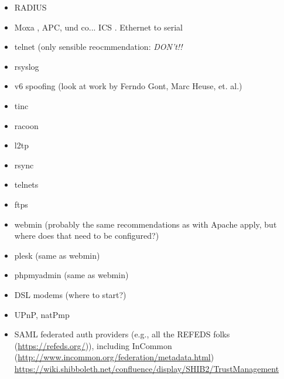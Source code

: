 \begin{minipage}[b]{0.5\linewidth}
\begin{itemize}
\item RADIUS 
\item Moxa , APC, und co... ICS . Ethernet to serial 
\item telnet (only sensible reocmmendation: \emph{DON't!!}
\item rsyslog 
\item v6 spoofing (look at work by Ferndo Gont, Marc Heuse, et. al.)
\item tinc
\item racoon
\item l2tp
\item rsync 
\item telnets 
\item ftps 
\item webmin (probably the same recommendations as with Apache apply, but where does that need to be configured?)
\item plesk (same as webmin)
\item phpmyadmin (same as webmin)
\item DSL modems (where to start?)
\item UPnP, natPmp 
\item SAML federated auth providers (e.g., all the REFEDS folks (\url{https://refeds.org/})), including InCommon (\url{http://www.incommon.org/federation/metadata.html})
  \url{https://wiki.shibboleth.net/confluence/display/SHIB2/TrustManagement} 
\end{itemize}
\end{minipage}





